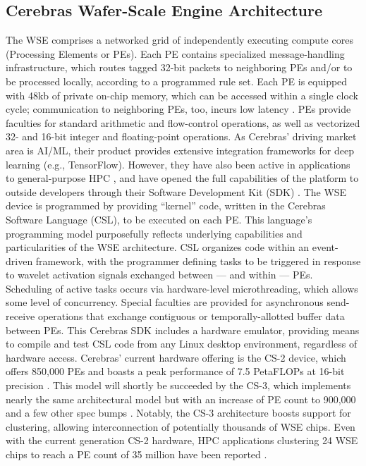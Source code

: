 \subsection{Cerebras Wafer-Scale Engine Architecture}

The WSE comprises a networked grid of independently executing compute cores (Processing Elements or PEs).
Each PE contains specialized message-handling infrastructure, which routes tagged 32-bit packets to neighboring PEs and/or to be processed locally, according to a programmed rule set.
Each PE is equipped with 48kb of private on-chip memory, which can be accessed within a single clock cycle;
communication to neighboring PEs, too, incurs low latency \citep{buitrago2021neocortex}.
PEs provide faculties for standard arithmetic and flow-control operations, as well as vectorized 32- and 16-bit integer and floating-point operations.
As Cerebras' driving market area is AI/ML, their product provides extensive integration frameworks for deep learning (e.g., TensorFlow).
However, they have also been active in applications to general-purpose HPC \citep{jacquelin2022scalable,rocki2020fast}, and have opened the full capabilities of the platform to outside developers through their Software Development Kit (SDK) \citep{selig2022cerebras}.
The WSE device is programmed by providing ``kernel'' code, written in the Cerebras Software Language (CSL), to be executed on each PE.
This language's programming model purposefully reflects underlying capabilities and particularities of the WSE architecture.
CSL organizes code within an event-driven framework, with the programmer defining tasks to be triggered in response to wavelet activation signals exchanged between --- and within --- PEs.
Scheduling of active tasks occurs via hardware-level microthreading, which allows some level of concurrency.
Special faculties are provided for asynchronous send-receive operations that exchange contiguous or temporally-allotted buffer data between PEs.
This Cerebras SDK includes a hardware emulator, providing means to compile and test CSL code from any Linux desktop environment, regardless of hardware access.
Cerebras' current hardware offering is the CS-2 device, which offers 850,000 PEs and boasts a peak performance of 7.5 PetaFLOPs at 16-bit precision \citep{lie2023cerebras}.
This model will shortly be succeeded by the CS-3, which implements nearly the same architectural model but with an increase of PE count to 900,000 and a few other spec bumps \citep{moore2024cerebras}.
Notably, the CS-3 architecture boosts support for clustering, allowing interconnection of potentially thousands of WSE chips.
Even with the current generation CS-2 hardware, HPC applications clustering 24 WSE chips to reach a PE count of 35 million have been reported \citep{ltaief2023scaling}.
